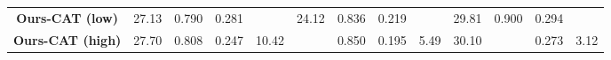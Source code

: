 \begin{table}[]
{\begin{tabular}{c|cccc|cccc|cccc}
\cellcolor[HTML]{FFFFFF}\textbf{Ours-CAT (low)}                              & 27.13    & 0.790    & 0.281    & \cellcolor[HTML]{FFC7CE}{4.33}     & 24.12      & 0.836      & 0.219     & \cellcolor[HTML]{FFC7CE}{2.87}      & 29.81     & 0.900     & 0.294    & \cellcolor[HTML]{FFC7CE}{1.56}     \\
\cellcolor[HTML]{FFFFFF}\textbf{Ours-CAT (high)}                             & 27.70    & 0.808    & 0.247    & 10.42    & \cellcolor[HTML]{FFEB9C}{24.45}      & 0.850      & 0.195     & 5.49      & 30.10     & \cellcolor[HTML]{FFEB9C}{0.910}     & 0.273    & 3.12     \\ \toprule
\end{tabular}
}
\vspace{-6pt}
\end{table}